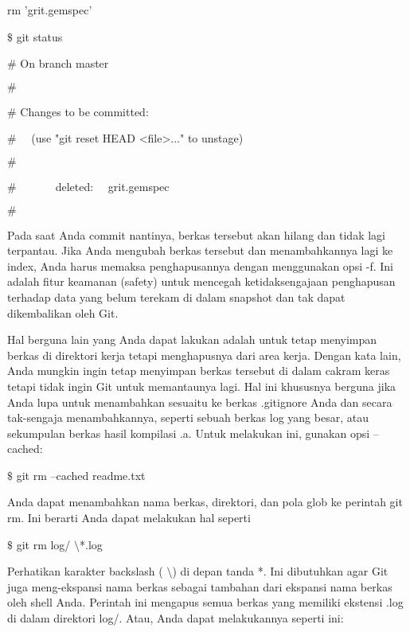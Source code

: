 \noindent 
rm 'grit.gemspec' \par
\noindent 
 $  \$  $ git status \par
\noindent 
 $  \#  $ On branch master \par
\noindent 
 $  \#  $ \par
\noindent 
 $  \#  $ Changes to be committed: \par
\noindent 
 $  \#  $~~ (use "git reset HEAD <file>..." to unstage) \par
\noindent 
 $  \#  $ \par
\noindent 
 $  \#  $~~~~~~~deleted:~~  grit.gemspec \par
\noindent 
 $  \#  $ \par
\vspace{12pt}
\vspace{12pt}
\noindent 
Pada saat Anda commit nantinya, berkas tersebut akan hilang dan tidak lagi terpantau. Jika Anda mengubah berkas tersebut dan menambahkannya lagi ke index, Anda harus memaksa penghapusannya dengan menggunakan opsi -f. Ini adalah fitur keamanan (safety) untuk mencegah ketidaksengajaan penghapusan terhadap data yang belum terekam di dalam snapshot dan tak dapat dikembalikan oleh Git. \par
\noindent 
Hal berguna lain yang Anda dapat lakukan adalah untuk tetap menyimpan berkas di direktori kerja tetapi menghapusnya dari area kerja. Dengan kata lain, Anda mungkin ingin tetap menyimpan berkas tersebut di dalam cakram keras tetapi tidak ingin Git untuk memantaunya lagi. Hal ini khususnya berguna jika Anda lupa untuk menambahkan sesuaitu ke berkas .gitignore Anda dan secara tak-sengaja menambahkannya, seperti sebuah berkas log yang besar, atau sekumpulan berkas hasil kompilasi .a. Untuk melakukan ini, gunakan opsi --cached: \par
\vspace{12pt}
\noindent 
 $  \$  $ git rm --cached readme.txt \par
\noindent 
Anda dapat menambahkan nama berkas, direktori, dan pola glob ke perintah git rm. Ini berarti Anda dapat melakukan hal seperti \par
\vspace{12pt}
\noindent 
 $  \$  $ git rm log/ $  \setminus  $*.log \par
\noindent 
Perhatikan karakter backslash ( $  \setminus  $) di depan tanda *. Ini dibutuhkan agar Git juga meng-ekspansi nama berkas sebagai tambahan dari ekspansi nama berkas oleh shell Anda. Perintah ini mengapus semua berkas yang memiliki ekstensi .log di dalam direktori log/. Atau, Anda dapat melakukannya seperti ini: \par
